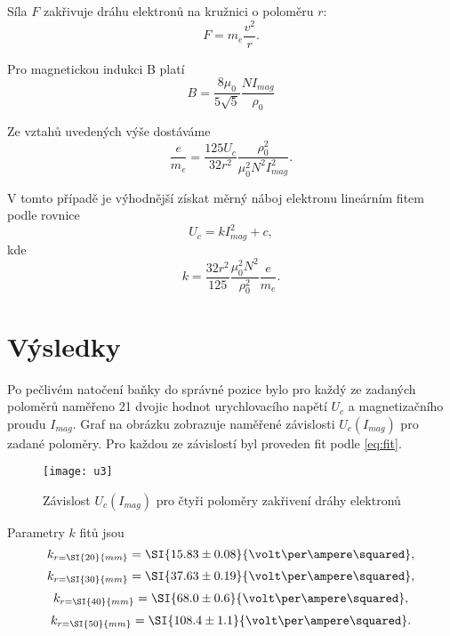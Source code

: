 \documentclass{protokol}
\begin{document}
    Síla $F$ zakřivuje dráhu elektronů na kružnici o poloměru $r$:
    \begin{equation}
      \label{eq:polomer}
      F = m_e \frac{v^2}{r}.
    \end{equation}

    Pro magnetickou indukci B platí 
    \begin{equation}
      \label{eq:B}
      B = \frac{8\mu_0}{5\sqrt{5}}\frac{NI_{mag}}{\rho_0}
    \end{equation}

    Ze vztahů uvedených výše dostáváme 
    \begin{equation}
      \label{eq:e_me}
      \frac{e}{m_e} = \frac{125 U_c}{32 r^2} \frac{\rho_0^2}{\mu_0^2 N^2 I_{mag}^2}.
    \end{equation}

    V tomto případě je výhodnější získat měrný náboj elektronu lineárním fitem podle rovnice
    \begin{equation}
      \label{eq:fit}
      U_c = k I_{mag}^2 + c,
    \end{equation}
    kde
    \begin{equation}
      \label{eq:k}
      k = \frac{32 r^2}{125} \frac{\mu_0^2 N^2}{\rho_0^2} \frac{e}{m_e}.
    \end{equation} 

  \section*{Výsledky}

    Po pečlivém natočení baňky do správné pozice bylo pro každý ze zadaných poloměrů naměřeno 21 dvojic hodnot urychlovacího napětí $U_c$ a magnetizačního proudu $I_{mag}$. Graf na obrázku zobrazuje naměřené závislosti $U_c(I_{mag})$ pro zadané poloměry. Pro každou ze závislostí byl proveden fit podle \eqref{eq:fit}.

    \begin{figure}[H]
      \centering 
      \texttt{[image: u3]}
      \caption{Závislost $U_c(I_{mag})$ pro čtyři poloměry zakřivení dráhy elektronů}
      \label{fig:u3}
    \end{figure}

    Parametry $k$ fitů jsou 
    $$ k_{r=\SI{20}{mm}} = \SI{15.83 \pm 0.08}{\volt\per\ampere\squared}, $$
    $$ k_{r=\SI{30}{mm}} = \SI{37.63 \pm 0.19}{\volt\per\ampere\squared}, $$
    $$ k_{r=\SI{40}{mm}} = \SI{68.0 \pm 0.6}{\volt\per\ampere\squared}, $$
    $$ k_{r=\SI{50}{mm}} = \SI{108.4 \pm 1.1}{\volt\per\ampere\squared}. $$
\end{document}
